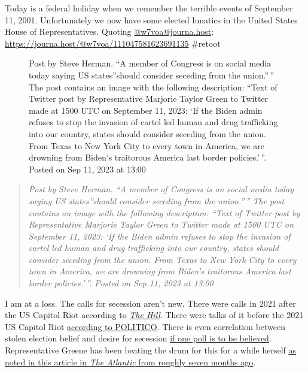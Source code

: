 Today is a federal holiday when we remember the terrible events of
September 11, 2001. Unfortunately we now have some elected lunatics in
the United States House of Representatives. Quoting
\href{https://journa.host/@w7voa/}{@w7voa@journa.host}:
\url{https://journa.host/@w7voa/111047581623691135} \#retoot

\begin{figure}
\centering
{}
\caption{Post by Steve Herman. ``A member of Congress is on social media
today saying US states''should consider seceding from the union.''\,''
The post contains an image with the following description: ``Text of
Twitter post by Representative Marjorie Taylor Green to Twitter made at
1500 UTC on September 11, 2023: `If the Biden admin refuses to stop the
invasion of cartel led human and drug trafficking into our country,
states should consider seceding from the union. From Texas to New York
City to every town in America, we are drowning from Biden's traitorous
America last border policies.'\,''. Posted on Sep 11, 2023 at 13:00}
\end{figure}

\begin{quote}
\emph{Post by Steve Herman. ``A member of Congress is on social media
today saying US states''should consider seceding from the union.''\,''
The post contains an image with the following description: ``Text of
Twitter post by Representative Marjorie Taylor Green to Twitter made at
1500 UTC on September 11, 2023: `If the Biden admin refuses to stop the
invasion of cartel led human and drug trafficking into our country,
states should consider seceding from the union. From Texas to New York
City to every town in America, we are drowning from Biden's traitorous
America last border policies.'\,''. Posted on Sep 11, 2023 at 13:00}
\end{quote}

I am at a loss. The calls for secession aren't new. There were calls in
2021 after the US Capitol Riot according to
\href{http://web.archive.org/web/20230604235034/https://thehill.com/changing-america/enrichment/arts-culture/563221-shocking-poll-finds-many-americans-now-want-to/}{\emph{The
Hill}}. There were talks of it before the 2021 US Capitol Riot
\href{http://web.archive.org/web/20230516215201/https://www.politico.com/news/magazine/2020/12/21/secession-donald-trump-449348}{according
to POLITICO}. There is even correlation between stolen election belief
and desire for secession
\href{http://web.archive.org/web/20230214165556/https://victory-insights.com/files/TX_Secession_Poll_OFFICIAL.pdf}{if
one poll is to be believed}. Representative Greene has been beating the
drum for this for a while herself
\href{http://web.archive.org/web/20230710173859/https://www.theatlantic.com/ideas/archive/2023/02/marjorie-taylor-greene-secession-civil-war/673142/}{as
noted in this article in \emph{The Atlantic} from roughly seven months
ago}.

